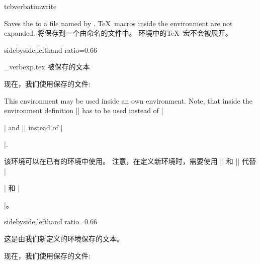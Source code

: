 \begin{docEnvironment}{tcbverbatimwrite}{}
\begin{stripedbox}
Saves the  to a file named by .
\TeX\ macros inside the environment are not expanded.
\tcblower
将保存到一个由命名的文件中。%
环境中的\TeX\ 宏不会被展开。
\end{stripedbox}

\begin{dispExample*}{sidebyside,lefthand ratio=0.66}
\begin{tcbverbatimwrite}{\jobname_verbexp.tex}
被保存的文本
\end{tcbverbatimwrite}

现在，我们使用保存的文件:\par

\end{dispExample*}

This environment may be used inside an own environment. Note, that inside
the environment definition |\tcbverbatimwrite| has to be used instead of
|\begin{tcbverbatimwrite}| and |\endtcbverbatimwrite| instead of |\end{tcbverbatimwrite}|.

该环境可以在已有的环境中使用。%
注意，在定义新环境时，需要使用 |\tcbverbatimwrite| 和 |\endtcbverbatimwrite| 代替 |\begin{tcbverbatimwrite}| 和 |\end{tcbverbatimwrite}|。

\begin{dispExample*}{sidebyside,lefthand ratio=0.66}
\newenvironment{myverbatim}{%
\begingroup{}}%
{\endtcbverbatimwrite\endgroup}

\begin{myverbatim}
这是由我们新定义的环境保存的文本。
\end{myverbatim}

现在，我们使用保存的文件:\par

\end{dispExample*}
\end{docEnvironment}

